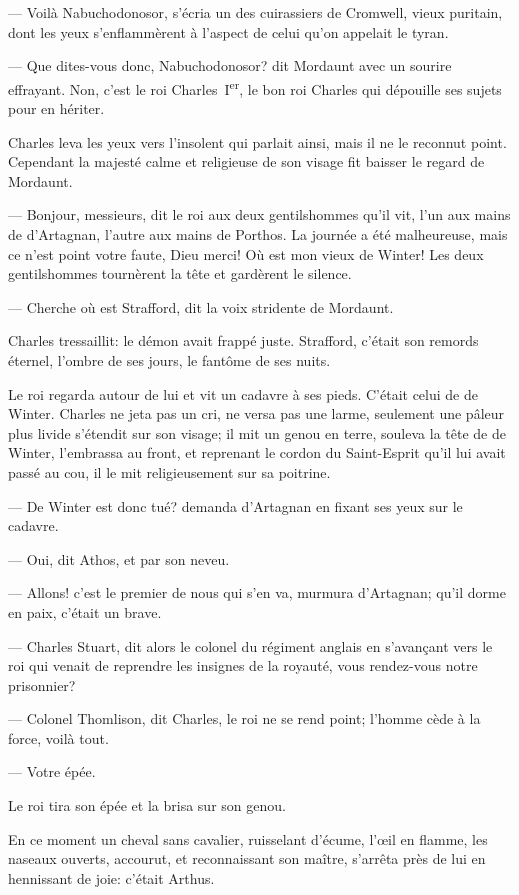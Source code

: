 — Voilà Nabuchodonosor, s'écria un des cuirassiers de Cromwell, vieux puritain, dont les yeux s'enflammèrent à l'aspect de celui qu'on appelait le tyran.

— Que dites-vous donc, Nabuchodonosor? dit Mordaunt avec un sourire effrayant. Non, c'est le roi Charles~I\textsuperscript{er}, le bon roi Charles qui dépouille ses sujets pour en hériter.

Charles leva les yeux vers l'insolent qui parlait ainsi, mais il ne le reconnut point. Cependant la majesté calme et religieuse de son visage fit baisser le regard de Mordaunt.

— Bonjour, messieurs, dit le roi aux deux gentilshommes qu'il vit, l'un aux mains de d'Artagnan, l'autre aux mains de Porthos.
La journée a été malheureuse, mais ce n'est point votre faute, Dieu merci! Où est mon vieux de Winter!
Les deux gentilshommes tournèrent la tête et gardèrent le silence.

— Cherche où est Strafford, dit la voix stridente de Mordaunt.

Charles tressaillit: le démon avait frappé juste. Strafford, c'était son remords éternel, l'ombre de ses jours, le fantôme de ses nuits.

Le roi regarda autour de lui et vit un cadavre à ses pieds. C'était celui de de Winter.
Charles ne jeta pas un cri, ne versa pas une larme, seulement une pâleur plus livide s'étendit sur son visage; il mit un genou en terre, souleva la tête de de Winter, l'embrassa au front, et reprenant le cordon du Saint-Esprit qu'il lui avait passé au cou, il le mit religieusement sur sa poitrine.

— De Winter est donc tué? demanda d'Artagnan en fixant ses yeux sur le cadavre.

— Oui, dit Athos, et par son neveu.

— Allons! c'est le premier de nous qui s'en va, murmura d'Artagnan; qu'il dorme en paix, c'était un brave.

— Charles Stuart, dit alors le colonel du régiment anglais en s'avançant vers le roi qui venait de reprendre les insignes de la royauté, vous rendez-vous notre prisonnier?

— Colonel Thomlison, dit Charles, le roi ne se rend point; l'homme cède à la force, voilà tout.

— Votre épée.

Le roi tira son épée et la brisa sur son genou.

En ce moment un cheval sans cavalier, ruisselant d'écume, l'œil en flamme, les naseaux ouverts, accourut, et reconnaissant son maître, s'arrêta près de lui en hennissant de joie: c'était Arthus.

